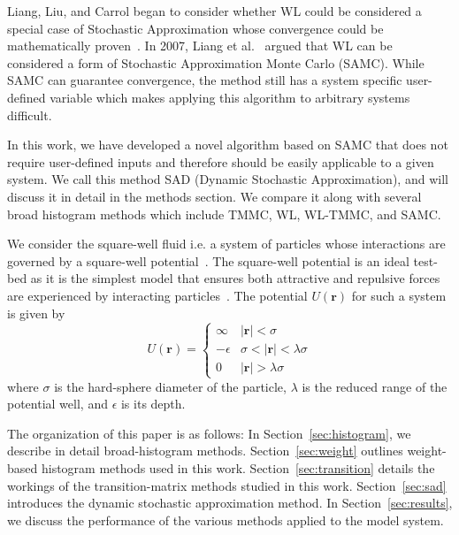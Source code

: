 \documentclass[letterpaper,twocolumn,amsmath,amssymb,pre,aps,10pt]{revtex4-1}
\begin{document}
Liang, Liu, and Carrol began to consider whether WL could be considered
a special case of Stochastic Approximation whose convergence could be
mathematically proven~\cite{liang2006theory, liang2007stochastic}. In
2007, Liang et al.~\cite{liang2007stochastic} argued that WL can be
considered a form of Stochastic Approximation Monte Carlo (SAMC). While
SAMC can guarantee convergence, the method still has a system specific
user-defined variable which makes applying this algorithm to arbitrary
systems difficult.

In this work, we have developed a novel algorithm based on SAMC that
does not require user-defined inputs and therefore should be easily
applicable to a given system.  We call this method SAD (Dynamic
Stochastic Approximation), and will discuss it in detail in the methods
section. We compare it along with several broad histogram methods
which include TMMC, WL, WL-TMMC, and SAMC.

We consider the square-well fluid i.e. a system of particles whose
interactions are governed by a square-well
potential~\cite{singh2003surface, barker2004perturbationSW}.  The
square-well potential is an ideal test-bed as it is the simplest model
that ensures both attractive and repulsive forces are experienced by
interacting particles~\cite{barker1967-SW-perturbation, vega1992phase}.
The potential $U(\textbf{r})$ for such a system is given by
\begin{equation}
 U(\textbf{r})=\begin{cases} \infty &
 \lvert\textbf{r}\rvert< \sigma\\-\epsilon &
 \sigma<\lvert\textbf{r}\rvert<\lambda\sigma\\0 &
 \lvert\textbf{r}\rvert > \lambda\sigma\end{cases}
\end{equation}
where $\sigma$ is the hard-sphere diameter of the particle, $\lambda$ is the
reduced range of the potential well, and $\epsilon$ is its depth.

The organization of this paper is as follows: In Section~\ref{sec:histogram}, we
describe in detail broad-histogram methods.  Section~\ref{sec:weight} outlines
weight-based histogram methods used in this work. Section~\ref{sec:transition}
details the workings of the transition-matrix methods studied in this work.
Section~\ref{sec:sad} introduces the dynamic stochastic approximation method.
In Section~\ref{sec:results}, we discuss the performance of the various methods 
applied to the model system.
\end{document}
